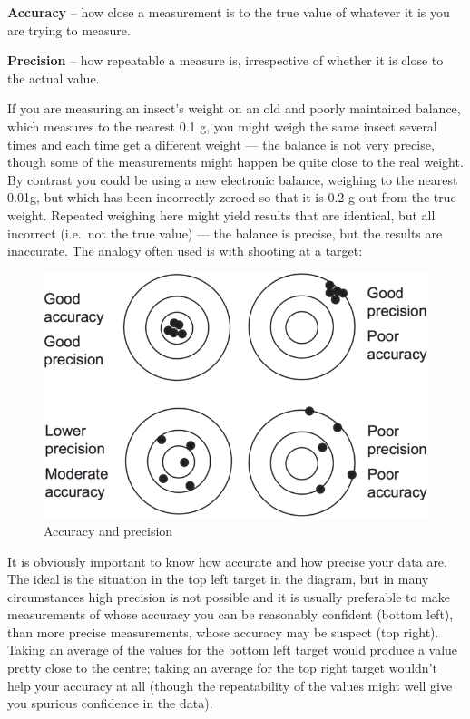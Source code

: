 \documentclass[]{book}
\begin{document}
\textbf{Accuracy} -- how close a measurement is to the true value of
whatever it is you are trying to measure.

\textbf{Precision} -- how repeatable a measure is, irrespective of
whether it is close to the actual value.

If you are measuring an insect's weight on an old and poorly maintained
balance, which measures to the nearest 0.1 g, you might weigh the same
insect several times and each time get a different weight --- the
balance is not very precise, though some of the measurements might
happen be quite close to the real weight. By contrast you could be using
a new electronic balance, weighing to the nearest 0.01g, but which has
been incorrectly zeroed so that it is 0.2 g out from the true weight.
Repeated weighing here might yield results that are identical, but all
incorrect (i.e.~not the true value) --- the balance is precise, but the
results are inaccurate. The analogy often used is with shooting at a
target:

\begin{figure}

{\centering \includegraphics[width=0.6\linewidth]{./images/targets} 

}

\caption{Accuracy and precision}\label{fig:targets}
\end{figure}

It is obviously important to know how accurate and how precise your data
are. The ideal is the situation in the top left target in the diagram,
but in many circumstances high precision is not possible and it is
usually preferable to make measurements of whose accuracy you can be
reasonably confident (bottom left), than more precise measurements,
whose accuracy may be suspect (top right). Taking an average of the
values for the bottom left target would produce a value pretty close to
the centre; taking an average for the top right target wouldn't help
your accuracy at all (though the repeatability of the values might well
give you spurious confidence in the data).
\end{document}
